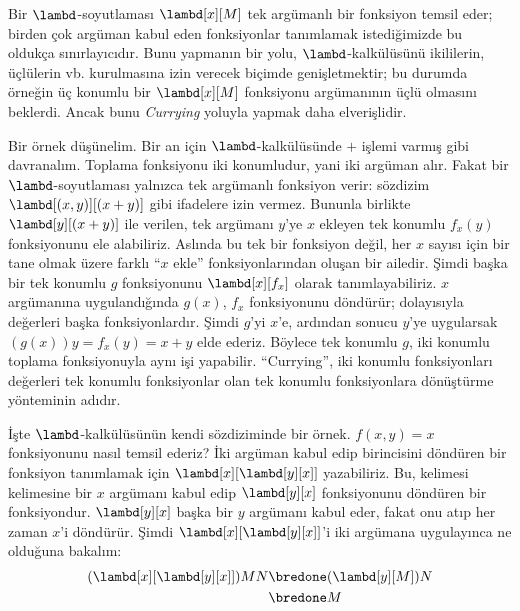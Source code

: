 \documentclass[../../../include/open-logic-section]{subfiles}
\begin{document}

Bir $\lambd$-soyutlaması $\lambd[x][M]$ tek argümanlı bir fonksiyon temsil
eder; birden çok argüman kabul eden fonksiyonlar tanımlamak istediğimizde bu
oldukça sınırlayıcıdır. Bunu yapmanın bir yolu, $\lambd$-kalkülüsünü
ikililerin, üçlülerin vb. kurulmasına izin verecek biçimde genişletmektir;
bu durumda örneğin üç konumlu bir $\lambd[x][M]$ fonksiyonu argümanının üçlü
olmasını beklerdi. Ancak bunu \emph{Currying} yoluyla yapmak daha elverişlidir.

Bir örnek düşünelim. Bir an için $\lambd$-kalkülüsünde $+$ işlemi varmış gibi
davranalım. Toplama fonksiyonu iki konumludur, yani iki argüman alır. Fakat
bir $\lambd$-soyutlaması yalnızca tek argümanlı fonksiyon verir: sözdizim
$\lambd[(x,y)][(x+y)]$ gibi ifadelere izin vermez. Bununla birlikte
$\lambd[y][(x+y)]$ ile verilen, tek argümanı $y$'ye $x$ ekleyen tek konumlu
$f_x(y)$ fonksiyonunu ele alabiliriz. Aslında bu tek bir fonksiyon değil,
her $x$ sayısı için bir tane olmak üzere farklı ``$x$ ekle'' fonksiyonlarından
oluşan bir ailedir. Şimdi başka bir tek konumlu $g$ fonksiyonunu
$\lambd[x][f_x]$ olarak tanımlayabiliriz. $x$ argümanına uygulandığında
$g(x)$, $f_x$ fonksiyonunu döndürür; dolayısıyla değerleri başka
fonksiyonlardır. Şimdi $g$'yi $x$'e, ardından sonucu $y$'ye uygularsak
$(g(x))y=f_x(y)=x+y$ elde ederiz. Böylece tek konumlu $g$, iki konumlu
toplama fonksiyonuyla aynı işi yapabilir. ``Currying'', iki konumlu
fonksiyonları değerleri tek konumlu fonksiyonlar olan tek konumlu
fonksiyonlara dönüştürme yönteminin adıdır.

İşte $\lambd$-kalkülüsünün kendi sözdiziminde bir örnek. $f(x,y)=x$
fonksiyonunu nasıl temsil ederiz? İki argüman kabul edip birincisini döndüren
bir fonksiyon tanımlamak için $\lambd[x][\lambd[y][x]]$ yazabiliriz. Bu,
kelimesi kelimesine bir $x$ argümanı kabul edip $\lambd[y][x]$ fonksiyonunu
döndüren bir fonksiyondur. $\lambd[y][x]$ başka bir $y$ argümanı kabul eder,
fakat onu atıp her zaman $x$'i döndürür. Şimdi
$\lambd[x][\lambd[y][x]]$'i iki argümana uygulayınca ne olduğuna bakalım:
\begin{align*}
  (\lambd[x][\lambd[y][x]])MN 
  \bredone & (\lambd[y][M])N \\
  \bredone & M
\end{align*}
\end{document}
